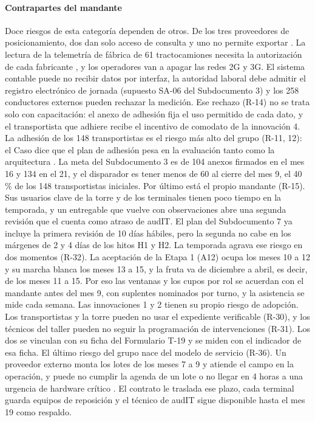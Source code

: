 \paragraph{Contrapartes del mandante}
Doce riesgos de esta categoría dependen de otros. De los tres proveedores de posicionamiento, dos dan solo acceso de
consulta y uno no permite exportar . La lectura de la telemetría de fábrica de
61 tractocamiones necesita la autorización de cada fabricante , y los operadores
van a apagar las redes 2G y 3G. El sistema contable puede no recibir datos por interfaz, la autoridad
laboral debe admitir el registro electrónico de jornada (supuesto SA-06 del Subdocumento 3) y los 258
conductores externos pueden rechazar la medición. Ese rechazo (R-14) no se trata solo con capacitación: el
anexo de adhesión fija el uso permitido de cada dato, y el transportista que adhiere recibe el
incentivo de comodato de la innovación 4. La adhesión de los 148 transportistas es el riesgo más
alto del grupo (R-11, 12): el Caso dice que el plan de adhesión pesa en la evaluación tanto como la arquitectura
. La meta del Subdocumento 3 es de 104 anexos firmados en el mes 16 y 134 en el
21, y el disparador es tener menos de 60 al cierre del mes 9, el 40 \% de los 148 transportistas iniciales. Por último
está el propio mandante (R-15). Sus usuarios clave de la torre y de los terminales tienen poco tiempo en
la temporada, y un entregable que vuelve con observaciones abre una segunda revisión que el
 cuenta como atraso de audIT. El plan del Subdocumento 7 ya incluye la primera revisión de
10 días hábiles, pero la segunda no cabe en los márgenes de 2 y 4 días de los hitos H1 y H2.
La temporada agrava ese riesgo en dos momentos (R-32). La aceptación de la Etapa 1 (A12) ocupa los meses
10 a 12 y su marcha blanca los meses 13 a 15, y la fruta va de diciembre a abril, es decir, de los meses
11 a 15. Por eso las ventanas y los cupos por rol se acuerdan con el mandante antes del mes 9, con
suplentes nominados por turno, y la asistencia se mide cada semana. Las innovaciones 1 y 2 tienen su
propio riesgo de adopción. Los transportistas y la torre pueden no usar el expediente verificable
(R-30), y los técnicos del taller pueden no seguir la programación de intervenciones (R-31). Los dos
se vinculan con su ficha del Formulario T-19 y se miden con el indicador de esa ficha. El último
riesgo del grupo nace del modelo de servicio (R-36). Un proveedor externo monta los lotes de los meses 7
a 9 y atiende el campo en la operación, y puede no cumplir la agenda de un lote o no llegar en 4 horas a
una urgencia de hardware crítico . El contrato le traslada ese plazo, cada
terminal guarda equipos de reposición y el técnico de audIT sigue disponible hasta el mes 19 como
respaldo.

